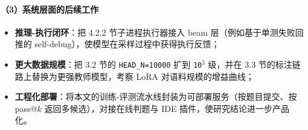 \paragraph{（3）系统层面的后续工作}
\begin{itemize}
    \item \textbf{推理-执行闭环}：把 4.2.2 节子进程执行器接入 beam 层（例如基于单测失败回推的 self-debug），使模型在采样过程中获得执行反馈；
    \item \textbf{更大数据规模}：把 3.2 节的 \texttt{HEAD\_N=10000} 扩到 \texttt{10$^5$} 级，并在 3.3 节的标注链路上替换为更强教师模型，考察 LoRA 对语料规模的增益曲线；
    \item \textbf{工程化部署}：将本文的训练-评测流水线封装为可部署服务（按题目提交、按 pass@$k$ 返回多候选），对接在线判题与 IDE 插件，使研究结论进一步产品化。
\end{itemize}
